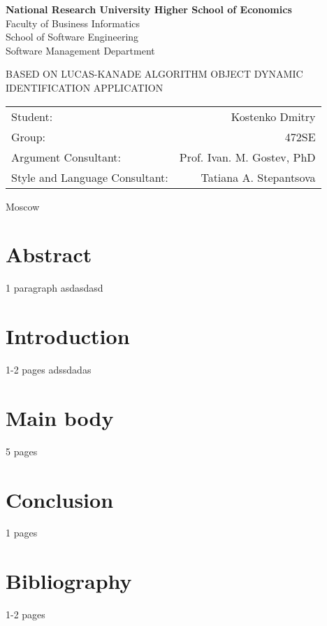\documentclass[12pt,a4paper,oneside,titlepage]{article}
\author{Kostenko}
\begin{document}
{
\thispagestyle{empty}
\newpage
\centering

\textbf{
National Research University Higher School of Economics\\
}
Faculty of Business Informatics\\
School of Software Engineering\\
Software Management Department

\vfill


\begin{large}
\MakeTextUppercase{
Based on Lucas-Kanade algorithm Object dynamic identification application
}
\end{large}


\vfill

\begin{tabular}{lr}
Student: & Kostenko Dmitry \\
Group: & 472SE \\
Argument Consultant: & Prof. Ivan. M. Gostev, PhD \\
Style and Language Consultant: & Tatiana A. Stepantsova
\end{tabular}

\vspace{\fill}

Moscow\\ \number\year
\clearpage
}


\section*{Abstract}
{
1 paragraph
asdasdasd
% 
}


{
\newpage
\centering
\tableofcontents
}


\newpage
\section*{Introduction}
1-2 pages
adssdadas


\newpage
\section*{Main body}
5 pages

\newpage
\section*{Conclusion}
1 pages
%


\newpage
\section*{Bibliography}
1-2 pages
\end{document}
